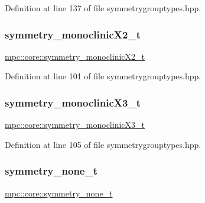 Definition at line 137 of file symmetrygrouptypes.\+hpp.

\mbox{\label{namespacempc_1_1core_a306d5d3ef71068ebd7f68b2fc7612f70}} 
\subsubsection{\texorpdfstring{symmetry\+\_\+monoclinic\+X2\+\_\+t}{symmetry\_monoclinicX2\_t}}
{\footnotesize\ttfamily \mbox{\hyperlink{namespacempc_1_1core_a306d5d3ef71068ebd7f68b2fc7612f70}{mpc\+::core\+::symmetry\+\_\+monoclinic\+X2\+\_\+t}}}



Definition at line 101 of file symmetrygrouptypes.\+hpp.

\mbox{\label{namespacempc_1_1core_a5d8f530135aa7d7848a2413cc8723662}} 
\subsubsection{\texorpdfstring{symmetry\+\_\+monoclinic\+X3\+\_\+t}{symmetry\_monoclinicX3\_t}}
{\footnotesize\ttfamily \mbox{\hyperlink{namespacempc_1_1core_a5d8f530135aa7d7848a2413cc8723662}{mpc\+::core\+::symmetry\+\_\+monoclinic\+X3\+\_\+t}}}



Definition at line 105 of file symmetrygrouptypes.\+hpp.

\mbox{\label{namespacempc_1_1core_a2b8454b3fb237992c1e1d43897efa248}} 
\subsubsection{\texorpdfstring{symmetry\+\_\+none\+\_\+t}{symmetry\_none\_t}}
{\footnotesize\ttfamily \mbox{\hyperlink{namespacempc_1_1core_a2b8454b3fb237992c1e1d43897efa248}{mpc\+::core\+::symmetry\+\_\+none\+\_\+t}}}



